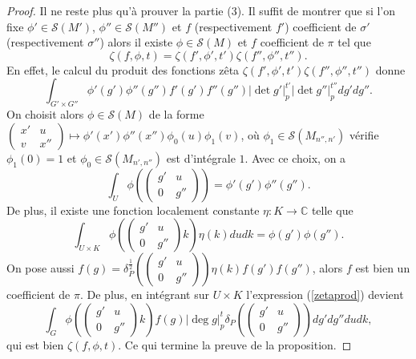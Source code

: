 \begin{proof}
Il ne reste plus qu'à prouver la partie (3). Il suffit de montrer que si l'on fixe $\phi' \in \mathcal{S}(M')$, $\phi'' \in \mathcal{S}(M'')$ et $f$ (respectivement $f'$) coefficient de $\sigma'$ (respectivement $\sigma''$) alors il existe $\phi \in \mathcal{S}(M)$ et $f$ coefficient de $\pi$ tel que
\begin{equation}
\zeta(f,\phi,t)=\zeta(f',\phi',t')\zeta(f'',\phi'',t'').
\end{equation}
En effet, le calcul du produit des fonctions zêta $\zeta(f',\phi',t')\zeta(f'',\phi'',t'')$ donne
\begin{equation}
\label{zetaprod}
\int_{G' \times G''} \phi'(g')\phi''(g'')f'(g')f''(g'')|\det g'|_p^{t'}|\det g''|_p^{t''}dg'dg''.
\end{equation}
On choisit alors $\phi \in \mathcal{S}(M)$ de la forme $\begin{pmatrix} 
x' & u \\
v & x'' 
\end{pmatrix} \mapsto \phi'(x')\phi''(x'')\phi_0(u)\phi_1(v)$, où $\phi_1 \in \mathcal{S}(M_{n'',n'})$ vérifie $\phi_1(0)=1$ et $\phi_0 \in \mathcal{S}(M_{n',n''})$ est d'intégrale $1$. Avec ce choix, on a
\begin{equation}
\int_U \phi(\begin{pmatrix} 
g' & u \\
0 & g'' 
\end{pmatrix})=\phi'(g')\phi''(g'').
\end{equation}
De plus, il existe une fonction localement constante $\eta : K \rightarrow \mathbb{C}$ telle que
\begin{equation}
\int_{U \times K} \phi(\begin{pmatrix} 
g' & u \\
0 & g'' 
\end{pmatrix}k)\eta(k)dudk = \phi(g')\phi(g'').
\end{equation}
On pose aussi $f(g)=\delta_P^{\frac{1}{2}}(\begin{pmatrix} 
g' & u \\
0 & g'' 
\end{pmatrix})\eta(k)f(g')f(g'')$, alors $f$ est bien un coefficient de $\pi$. De plus, en intégrant sur $U \times K$ l'expression (\ref{zetaprod}) devient
\begin{equation}
\int_G \phi(\begin{pmatrix} 
g' & u \\
0 & g'' 
\end{pmatrix}k)f(g)|\deg g|_p^t\delta_P(\begin{pmatrix} 
g' & u \\
0 & g'' 
\end{pmatrix})dg'dg''dudk,
\end{equation}
qui est bien $\zeta(f,\phi,t)$. Ce qui termine la preuve de la proposition.
\end{proof}